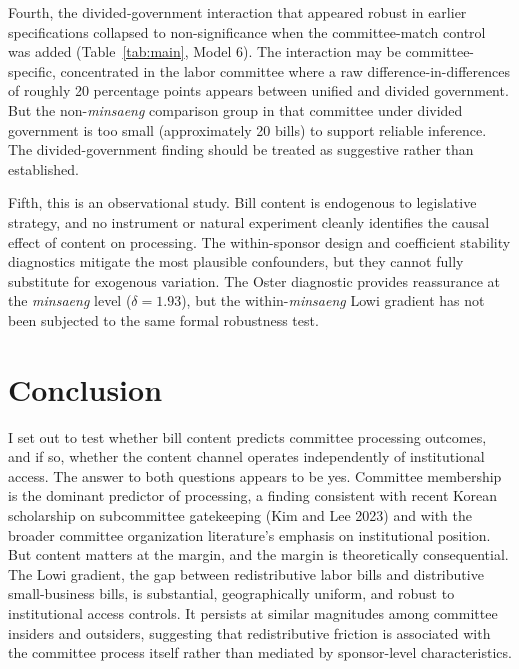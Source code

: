 \documentclass[11pt]{article}
\begin{document}
Fourth, the divided-government interaction that appeared robust in earlier specifications collapsed to non-significance when the committee-match control was added (Table~\ref{tab:main}, Model 6). The interaction may be committee-specific, concentrated in the labor committee where a raw difference-in-differences of roughly 20 percentage points appears between unified and divided government. But the non-\emph{minsaeng} comparison group in that committee under divided government is too small (approximately 20 bills) to support reliable inference. The divided-government finding should be treated as suggestive rather than established.

Fifth, this is an observational study. Bill content is endogenous to legislative strategy, and no instrument or natural experiment cleanly identifies the causal effect of content on processing. The within-sponsor design and coefficient stability diagnostics mitigate the most plausible confounders, but they cannot fully substitute for exogenous variation. The Oster diagnostic provides reassurance at the \emph{minsaeng} level ($\delta = 1.93$), but the within-\emph{minsaeng} Lowi gradient has not been subjected to the same formal robustness test.


\section{Conclusion}\label{sec:conclusion}

I set out to test whether bill content predicts committee processing outcomes, and if so, whether the content channel operates independently of institutional access. The answer to both questions appears to be yes. Committee membership is the dominant predictor of processing, a finding consistent with recent Korean scholarship on subcommittee gatekeeping (Kim and Lee 2023) and with the broader committee organization literature's emphasis on institutional position. But content matters at the margin, and the margin is theoretically consequential. The Lowi gradient, the gap between redistributive labor bills and distributive small-business bills, is substantial, geographically uniform, and robust to institutional access controls. It persists at similar magnitudes among committee insiders and outsiders, suggesting that redistributive friction is associated with the committee process itself rather than mediated by sponsor-level characteristics.
\end{document}
